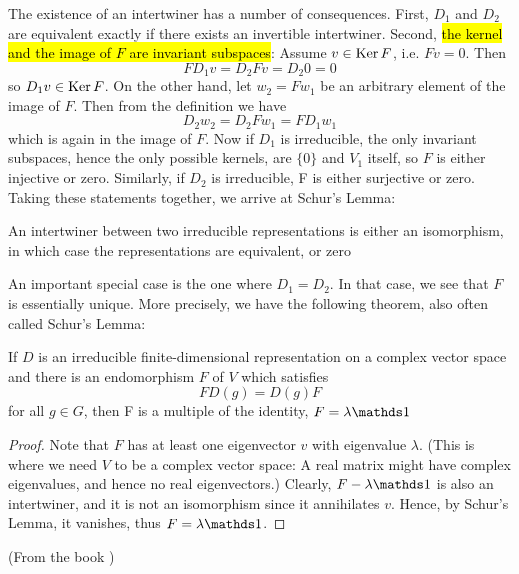 The existence of an intertwiner has a number of consequences. First,
$D_1$ and $D_2$ are equivalent exactly if there exists an invertible
intertwiner. Second, \hl{the kernel and the image of $F$ are invariant
subspaces}: Assume $v\in \operatorname{Ker}{F}$, i.e. $Fv = 0$. Then
\begin{equation}
    FD_1 v = D_2 F v = D_2 0 = 0
\end{equation}
so $D_1 v\in \operatorname{Ker}{F}$. On the other hand, let $w_2 = Fw_1$ be an
arbitrary element of the image of $F$. Then from the definition we have
\begin{equation}
    D_2 w_2 = D_2 F w_1 = FD_1 w_1
\end{equation}
which is again in the image of $F$. Now if $D_1$ is irreducible, the only invariant subspaces,
hence the only possible kernels, are $\{0\}$ and $V_1$ itself, so $F$ is either injective or zero.
Similarly, if $D_2$ is irreducible, F is either surjective or zero. Taking these statements together, we arrive at Schur’s Lemma: 

\begin{lemma}
    An intertwiner between two irreducible representations is either
    an isomorphism, in which case the representations are equivalent,
    or zero
\end{lemma}

An important special case is the one where $D_1 = D_2$. In that case,
we see that $F$ is essentially unique. More precisely, we have the
following theorem, also often called Schur’s Lemma:
\begin{lemma}
    If $D$ is an irreducible finite-dimensional representation on a complex
vector space and there is an endomorphism $F$ of $V$ which satisfies 
\begin{equation}
    FD(g) = D(g) F
\end{equation}
for all $g\in G$, then F is a multiple of the identity, $F = \lambda
\id$
\end{lemma}
\begin{proof}
    Note that $F$ has at least one eigenvector $v$ with eigenvalue
    $\lambda$. (This is where we need $V$ to be a complex vector
    space: A real matrix might have complex eigenvalues, and hence no
    real eigenvectors.) Clearly, $F-\lambda\id$ is also an
    intertwiner, and it is not an isomorphism since it annihilates
    $v$. Hence, by Schur’s Lemma, it vanishes, thus $F = \lambda\id$.
\end{proof}

(From the book \cite{book})
